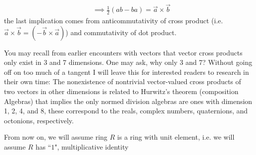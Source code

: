     \begin{align}
    &\implies \frac{1}{2}(ab-ba)=\overrightarrow{a}\times\overrightarrow{b} \nonumber
\end{align}
the last implication comes from anticommutativity of cross product (i.e.
$\overrightarrow{a}\times \overrightarrow{b}= (-\overrightarrow{b}\times \overrightarrow{a})$) and
commutativity of dot product.

You may recall from earlier encounters with vectors that vector cross products only exist in 3 and 7
dimensions. One may ask, why only 3 and 7? Without going off on too much of a tangent I will leave
this for interested readers to research in their own time: The nonexistence of nontrivial
vector-valued cross products of two vectors in other dimensions is related to Hurwitz's theorem
(composition Algebras) that implies the only normed division algebras are ones with dimension 1, 2,
4, and 8, these correspond to the reals, complex numbers, quaternions, and octonions, respectively.
\begin{tcolorbox}
\begin{center}
    From now on, we will assume ring $R$ is a ring with unit element, i.e. we will assume $R$ has
    ``$1$", multiplicative identity
\end{center}
\end{tcolorbox}
